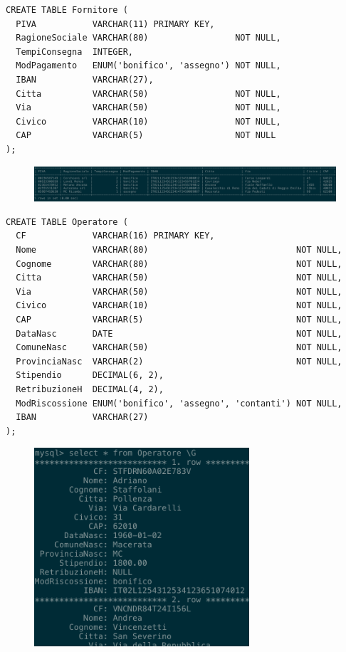     \begin{lstlisting}
CREATE TABLE Fornitore (
  PIVA           VARCHAR(11) PRIMARY KEY,
  RagioneSociale VARCHAR(80)                 NOT NULL,
  TempiConsegna  INTEGER,
  ModPagamento   ENUM('bonifico', 'assegno') NOT NULL,
  IBAN           VARCHAR(27),
  Citta          VARCHAR(50)                 NOT NULL,
  Via            VARCHAR(50)                 NOT NULL,
  Civico         VARCHAR(10)                 NOT NULL,
  CAP            VARCHAR(5)                  NOT NULL
);
    \end{lstlisting}
    \begin{figure}[H]
      \centering
      \includegraphics[width=15cm]{images/screenshots/schema/fornitore.png}
    \end{figure}

    \begin{lstlisting}
CREATE TABLE Operatore (
  CF             VARCHAR(16) PRIMARY KEY,
  Nome           VARCHAR(80)                             NOT NULL,
  Cognome        VARCHAR(80)                             NOT NULL,
  Citta          VARCHAR(50)                             NOT NULL,
  Via            VARCHAR(50)                             NOT NULL,
  Civico         VARCHAR(10)                             NOT NULL,
  CAP            VARCHAR(5)                              NOT NULL,
  DataNasc       DATE                                    NOT NULL,
  ComuneNasc     VARCHAR(50)                             NOT NULL,
  ProvinciaNasc  VARCHAR(2)                              NOT NULL,
  Stipendio      DECIMAL(6, 2),
  RetribuzioneH  DECIMAL(4, 2),
  ModRiscossione ENUM('bonifico', 'assegno', 'contanti') NOT NULL,
  IBAN           VARCHAR(27)
);
    \end{lstlisting}
    \begin{figure}[H]
      \centering
      \includegraphics[width=8cm]{images/screenshots/schema/operatore.png}
    \end{figure}

